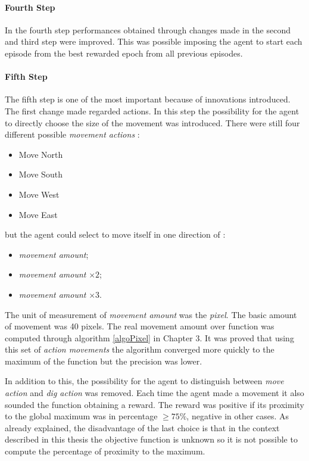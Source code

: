 \paragraph{Fourth Step} In the fourth step performances obtained through changes made in the second and third step were improved. This was possible imposing the agent to start each episode from the best rewarded epoch from all previous episodes.

\paragraph{Fifth Step} The fifth step is one of the most important because of innovations introduced. The first change made regarded actions. In this step the possibility for the agent to directly choose the size of the movement was introduced. There were still four different possible \textit{movement actions} :

\begin{itemize}
	\item Move North
	\item Move South
	\item Move West
	\item Move East
\end{itemize}

but the agent could select to move itself in one direction of :

\begin{itemize}
	\item \textit{movement amount};
	\item \textit{movement amount} $\times 2$;
	\item \textit{movement amount} $\times 3$.
\end{itemize}

The unit of measurement of \textit{movement amount} was the \textit{pixel}. The basic amount of movement was 40 pixels. The real movement amount over function was computed through algorithm \ref{algoPixel} in Chapter $3$. It was proved that using this set of \textit{action movements} the algorithm converged more quickly to the maximum of the function but the precision was lower. 

In addition to this, the possibility for the agent to distinguish between \textit{move action} and \textit{dig action} was removed. Each time the agent made a movement it also sounded the function obtaining a reward. The reward was positive if its proximity to the global maximum was in percentage $\ge 75\%$, negative in other cases. As already explained, the disadvantage of the last choice is that in the context described in this thesis the objective function is unknown so it is not possible to compute the percentage of proximity to the maximum.

